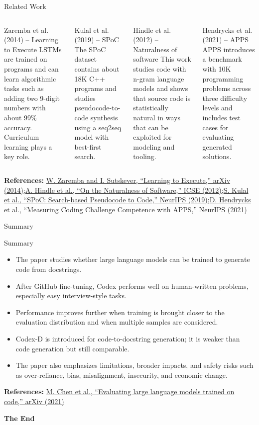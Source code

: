 \documentclass[aspectratio=43,9pt]{beamer}
\newcommand{\srclink}[2]{\href{#2}{\textcolor{black!68}{#1}}}
\newcommand{\sep}{;\hspace{0.35em}}
\newcommand{\refline}[2][References]{%
  \vfill
  {\raggedright\fontsize{5.1}{5.5}\selectfont\color{black!68}\textbf{#1:} #2\par}%
}
\newcommand{\srcChen}{\srclink{M. Chen et al., ``Evaluating large language models trained on code,'' arXiv (2021)}{https://arxiv.org/abs/2107.03374}}
\newcommand{\srcKulal}{\srclink{S. Kulal et al., ``SPoC: Search-based Pseudocode to Code,'' NeurIPS (2019)}{https://arxiv.org/abs/1906.04908}}
\newcommand{\srcHendrycks}{\srclink{D. Hendrycks et al., ``Measuring Coding Challenge Competence with APPS,'' NeurIPS (2021)}{https://arxiv.org/abs/2105.09938}}
\newcommand{\srcZaremba}{\srclink{W. Zaremba and I. Sutskever, ``Learning to Execute,'' arXiv (2014)}{https://arxiv.org/abs/1410.4615}}
\newcommand{\srcHindle}{\srclink{A. Hindle et al., ``On the Naturalness of Software,'' ICSE (2012)}{https://softwareprocess.es/homepage/papers/2012-hindle12012icse/}}
\begin{document}
\begin{frame}{Related Work}
\tiny
\begin{columns}[T,totalwidth=\textwidth]
\begin{block}{Zaremba et al. (2014) -- Learning to Execute}
LSTMs are trained on programs and can learn algorithmic tasks such as adding two 9-digit numbers with about 99\% accuracy. Curriculum learning plays a key role.
\end{block}

\begin{block}{Kulal et al. (2019) -- SPoC}
The SPoC dataset contains about 18K C++ programs and studies pseudocode-to-code synthesis using a seq2seq model with best-first search.
\end{block}

\begin{block}{Hindle et al. (2012) -- Naturalness of software}
This work studies code with n-gram language models and shows that source code is statistically natural in ways that can be exploited for modeling and tooling.
\end{block}

\begin{block}{Hendrycks et al. (2021) -- APPS}
APPS introduces a benchmark with 10K programming problems across three difficulty levels and includes test cases for evaluating generated solutions.
\end{block}
\end{columns}

\refline{\srcZaremba\sep \srcHindle\sep \srcKulal\sep \srcHendrycks}
\end{frame}

\begin{frame}{Summary}
\small
\begin{block}{Summary}
\begin{itemize}
  \item The paper studies whether large language models can be trained to generate code from docstrings.
  \item After GitHub fine-tuning, Codex performs well on human-written problems, especially easy interview-style tasks.
  \item Performance improves further when training is brought closer to the evaluation distribution and when multiple samples are considered.
  \item Codex-D is introduced for code-to-docstring generation; it is weaker than code generation but still comparable.
  \item The paper also emphasizes limitations, broader impacts, and safety risks such as over-reliance, bias, misalignment, insecurity, and economic change.
\end{itemize}
\end{block}

\refline{\srcChen}
\end{frame}

\begin{frame}[plain]
\centering
{\Huge\bfseries The End}
\end{frame}
\end{document}
